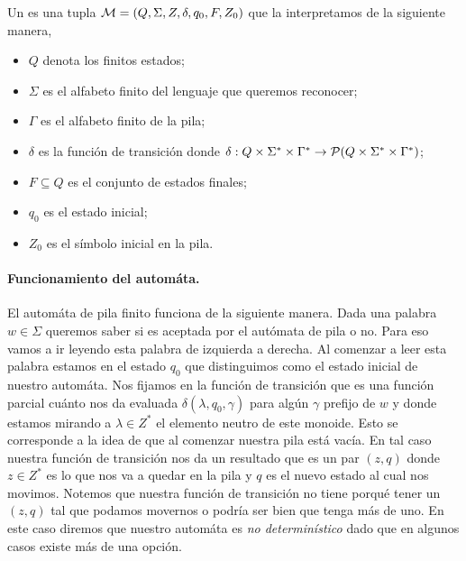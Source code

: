 \documentclass[tesis.tex]{subfiles}
\begin{document}
\begin{deff}
	Un  es una tupla ${\cal M } = (Q, \Sigma, Z, \delta, q_0, F, Z_0)$ que la interpretamos de la siguiente manera,
	\begin{itemize}
		\item $Q$ denota los finitos estados;
		\item $\Sigma$ es el alfabeto finito del lenguaje que queremos reconocer;
		\item $\Gamma$ es el alfabeto finito de la pila;
		\item $\delta$ es la función de transición donde $\delta: Q  \times \Sigma^* \times \Gamma^* \to {\cal P}( Q  \times \Sigma^* \times \Gamma^*)$;
		\item $F \subseteq Q$ es el conjunto de estados finales;
		\item $q_0$ es el estado inicial;
		\item $Z_0$ es el símbolo inicial en la pila.
	\end{itemize}
\end{deff}


\paragraph{Funcionamiento del automáta.}

El automáta de pila finito funciona de la siguiente manera. Dada una palabra $w \in \Sigma$ queremos saber si es aceptada por el autómata de pila o no. Para eso vamos a ir leyendo esta palabra de izquierda a derecha. Al comenzar a leer esta palabra estamos en el estado $q_0$ que distinguimos como el estado inicial de nuestro automáta. Nos fijamos en la función de transición que es una función parcial cuánto nos da evaluada  $\delta(\lambda,q_0,\gamma)$ para algún $\gamma$ prefijo de $w$ y donde estamos mirando a $\lambda \in Z^*$ el elemento neutro de este monoide. Esto se corresponde a la idea de que al comenzar nuestra pila está vacía. En tal caso nuestra función de transición nos da un resultado que es un par $(z,q)$ donde $z \in Z^{*}$ es lo que nos va a quedar en la pila y $q$ es el nuevo estado al cual nos movimos. Notemos que nuestra función de transición no tiene porqué tener un $(z,q)$ tal que podamos movernos o podría ser bien que tenga más de uno. En este caso diremos que nuestro automáta es \textit{no determinístico} dado que en algunos casos existe más de una opción.
\end{document}
